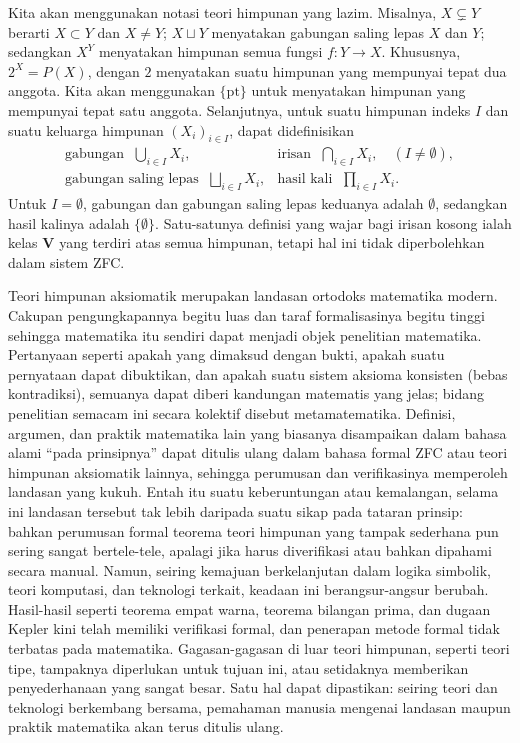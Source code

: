 Kita akan menggunakan notasi teori himpunan yang lazim. Misalnya, $X \subsetneq Y$ berarti $X \subset Y$ dan $X \neq Y$; $X \sqcup Y$ menyatakan gabungan saling lepas $X$ dan $Y$; sedangkan $X^Y$  menyatakan himpunan semua fungsi $f: Y \to X$. Khususnya, $2^X = P(X)$, dengan $2$ menyatakan suatu himpunan yang mempunyai tepat dua anggota. Kita akan menggunakan $\{\text{pt}\}$ untuk menyatakan himpunan yang mempunyai tepat satu anggota. Selanjutnya, untuk suatu himpunan indeks $I$ dan suatu keluarga himpunan $(X_i)_{i \in I}$, dapat didefinisikan
\[ \begin{array}{ll}
	\text{gabungan } \; \bigcup_{i \in I} X_i, & \text{irisan } \; \bigcap_{i \in I} X_i, \quad (I \neq \emptyset), \\
	\text{gabungan saling lepas } \; \bigsqcup_{i \in I} X_i, & \text{hasil kali } \; \prod_{i \in I} X_i.
\end{array}\]
Untuk $I=\emptyset$, gabungan dan gabungan saling lepas keduanya adalah $\emptyset$, sedangkan hasil kalinya adalah $\{\emptyset\}$. Satu-satunya definisi yang wajar bagi irisan kosong ialah kelas $\textbf{V}$ yang terdiri atas semua himpunan, tetapi hal ini tidak diperbolehkan dalam sistem ZFC.

Teori himpunan aksiomatik merupakan landasan ortodoks matematika modern. Cakupan pengungkapannya begitu luas dan taraf formalisasinya begitu tinggi sehingga matematika itu sendiri dapat menjadi objek penelitian matematika. Pertanyaan seperti apakah yang dimaksud dengan bukti, apakah suatu pernyataan dapat dibuktikan, dan apakah suatu sistem aksioma konsisten (bebas kontradiksi), semuanya dapat diberi kandungan matematis yang jelas; bidang penelitian semacam ini secara kolektif disebut metamatematika. Definisi, argumen, dan praktik matematika lain yang biasanya disampaikan dalam bahasa alami ``pada prinsipnya'' dapat ditulis ulang dalam bahasa formal ZFC atau teori himpunan aksiomatik lainnya, sehingga perumusan dan verifikasinya memperoleh landasan yang kukuh. Entah itu suatu keberuntungan atau kemalangan, selama ini landasan tersebut tak lebih daripada suatu sikap pada tataran prinsip: bahkan perumusan formal teorema teori himpunan yang tampak sederhana pun sering sangat bertele-tele, apalagi jika harus diverifikasi atau bahkan dipahami secara manual. Namun, seiring kemajuan berkelanjutan dalam logika simbolik, teori komputasi, dan teknologi terkait, keadaan ini berangsur-angsur berubah. Hasil-hasil seperti teorema empat warna, teorema bilangan prima, dan dugaan Kepler kini telah memiliki verifikasi formal, dan penerapan metode formal tidak terbatas pada matematika. Gagasan-gagasan di luar teori himpunan, seperti teori tipe, tampaknya diperlukan untuk tujuan ini, atau setidaknya memberikan penyederhanaan yang sangat besar. Satu hal dapat dipastikan: seiring teori dan teknologi berkembang bersama, pemahaman manusia mengenai landasan maupun praktik matematika akan terus ditulis ulang.
\ifdefined\UnitTwoZFCReader\expandafter\endinput\fi
